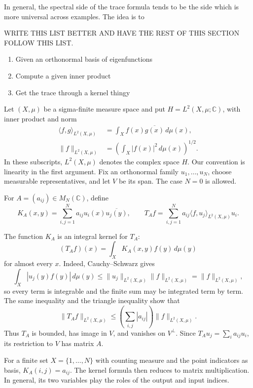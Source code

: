 \label{finite-kernel-model}

In general, the spectral side of the trace formula tends to be the side which is more universal across examples. The idea is to 

WRITE THIS LIST BETTER AND HAVE THE REST OF THIS SECTION FOLLOW THIS LIST. 
\begin{enumerate}
    \item Given an orthonormal basis of eigenfunctions
    \item Compute a given inner product 
    \item Get the trace through a kernel thingy
\end{enumerate}

Let $(X,\mu)$ be a sigma-finite measure space and put $H=L^2(X,\mu;\mathbb C)$, with inner product and norm
\[
\begin{aligned}
\langle f,g\rangle_{L^2(X,\mu)}&=\int_X f(x)\overline{g(x)}\,d\mu(x),\\
\|f\|_{L^2(X,\mu)}&=\left(\int_X|f(x)|^2\,d\mu(x)\right)^{1/2}.
\end{aligned}
\]
In these subscripts, $L^2(X,\mu)$ denotes the complex space $H$. Our convention is linearity in the first argument. Fix an orthonormal family $u_1,\ldots,u_N$, choose measurable representatives, and let $V$ be its span. The case $N=0$ is allowed.

\begin{definition}\label{finite-kernel-operator}
For $A=(a_{ij})\in M_N(\mathbb C)$, define
\[
K_A(x,y)=\sum_{i,j=1}^N a_{ij}u_i(x)\overline{u_j(y)},
\qquad
T_Af=\sum_{i,j=1}^N a_{ij}\langle f,u_j\rangle_{L^2(X,\mu)} u_i.
\]
\end{definition}

The function $K_A$ is an integral kernel for $T_A$:
\[
(T_Af)(x)=\int_X K_A(x,y)f(y)\,d\mu(y)
\]
for almost every $x$. Indeed, Cauchy--Schwarz gives
\[
\int_X|u_j(y)f(y)|\,d\mu(y)\leq\|u_j\|_{L^2(X,\mu)}\|f\|_{L^2(X,\mu)}=\|f\|_{L^2(X,\mu)},
\]
so every term is integrable and the finite sum may be integrated term by term. The same inequality and the triangle inequality show that
\[
\|T_Af\|_{L^2(X,\mu)}\leq\left(\sum_{i,j}|a_{ij}|\right)\|f\|_{L^2(X,\mu)}.
\]
Thus $T_A$ is bounded, has image in $V$, and vanishes on $V^\perp$. Since $T_Au_j=\sum_i a_{ij}u_i$, its restriction to $V$ has matrix $A$.

For a finite set $X=\{1,\ldots,N\}$ with counting measure and the point indicators as basis, $K_A(i,j)=a_{ij}$. The kernel formula then reduces to matrix multiplication. In general, its two variables play the roles of the output and input indices.

